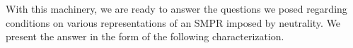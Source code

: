 \documentclass[prodmode,acmec]{ec-acmsmall}
\newcommand{\calL}{{\mathcal{L}}}
\newcommand{\rank}{{\calL(A)}}
\begin{document}
With this machinery, we are ready to answer the questions we posed regarding conditions on various representations of an SMPR imposed by neutrality. We present the answer in the form of the following characterization.
%

\end{document}
